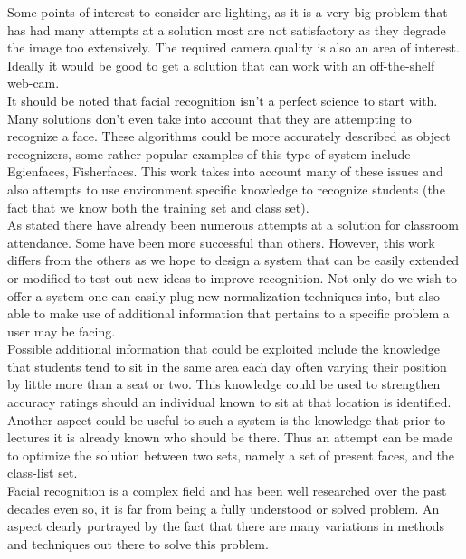 		Some points of interest to consider are lighting, as it is a very big problem that has had many attempts at a 
		solution most are not satisfactory as they degrade the image too extensively.  The required camera quality is 
		also an area of interest.  Ideally it would be good to get a solution that can work with an off-the-shelf 
		web-cam.  \\		
		
		It should be noted that facial recognition isn't a perfect science to start with.  Many solutions don't even 
		take into account that they are attempting to recognize a face.  These algorithms could be more accurately
		described as object recognizers, some rather popular examples of this type of system include Egienfaces, 
		Fisherfaces. This work takes into account many of these issues and also attempts to use environment specific 
		knowledge to recognize students (the fact that we know both the training set and class set). \\
		
		As stated there have already been numerous attempts at a solution for classroom attendance.  Some have been 
		more successful than others.  However, this work differs from the others as we hope to design a system that 
		can be easily extended or modified to test out new ideas to improve recognition.  Not only do we wish to offer 
		a system one can easily plug new normalization techniques into, but also able to make use of additional 
		information that pertains to a specific problem a user may be facing. \\
		
		Possible additional information that could be exploited include the knowledge that students tend to sit in the 
		same area each day often varying their position by little more than a seat or two.  This knowledge could be used 
		to strengthen accuracy ratings should an individual known to sit at that location is identified.  Another aspect 
		could be useful to such a system is the knowledge that prior to lectures it is already known who should be there.  
		Thus an attempt can be made to optimize the solution between two sets, namely a set of present faces, and the 
		class-list set. \\

		Facial recognition is a complex field and has been well researched over the past decades even so, it is far from 
		being a fully understood or solved problem.  An aspect clearly portrayed by the fact that there are many 
		variations in methods and techniques out there to solve this problem. \\
		
